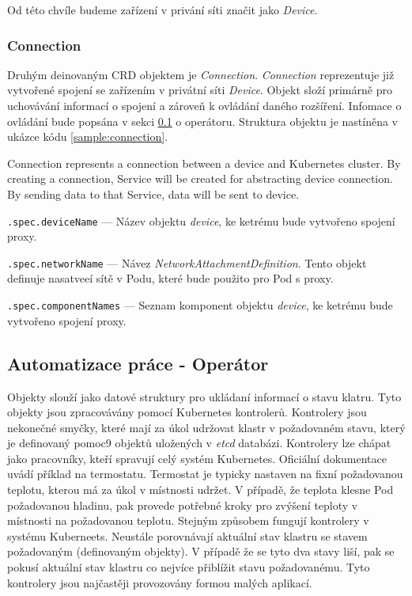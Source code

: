 Od této chvíle budeme zařízení v privání síti značit jako \textit{Device}.

\subsubsection*{Connection}
Druhým deinovaným CRD objektem je \textit{Connection}. \textit{Connection} reprezentuje již vytvořené spojení se zařízením v privátní síti \textit{Device}. Objekt složí primárně pro uchovávání informací o spojení a zároveň k ovládání daného rozšíření. Infomace o ovládání bude popsána v sekci \ref{sec:operator} o operátoru. Struktura objektu je nastíněna v ukázce kódu \ref{sample:connection}.


Connection represents a connection between a device and Kubernetes cluster. By creating a connection, Service will be created for abstracting device connection. By sending data to that Service, data will be sent to device.


\begin{description}
    \item \verb|.spec.deviceName| --- Název objektu \textit{device}, ke ketrému bude vytvořeno spojení proxy. 
    \item \verb|.spec.networkName| --- Návez \textit{NetworkAttachmentDefinition}. Tento objekt definuje nasatveeí sítě v Podu, které bude použito pro Pod s proxy.
    \item \verb|.spec.componentNames| --- Seznam komponent objektu \textit{device}, ke ketrému bude vytvořeno spojení proxy. 
\end{description}

\subsection{Automatizace práce - Operátor}\label{sec:operator}
Objekty slouží jako datové struktury pro ukládaní informací o stavu klatru. Tyto objekty jsou zpracovávány pomocí Kubernetes kontrolerů. Kontrolery jsou nekonečné smyčky, které mají za úkol udržovat klastr v požadovaném stavu, který je definovaný pomoc9 objektů uložených v \textit{etcd} databázi. Kontrolery lze chápat jako pracovníky, kteří spravují celý systém Kubernetes. Oficiální dokumentace uvádí příklad na termostatu. Termostat je typicky nastaven na fixní požadovanou teplotu, kterou má za úkol v místnosti udržet. V případě, že teplota klesne Pod požadovanou hladinu, pak provede potřebné kroky pro zvýšení teploty v místnosti na požadovanou teplotu. Stejným způsobem fungují kontrolery v systému Kuberneets. Neustále porovnávají aktuální stav klastru se stavem požadovaným (definovaným objekty). V případě že se tyto dva stavy liší, pak se pokusí aktuální stav klastru co nejvíce přiblížit stavu požadovanému. Tyto kontrolery jsou najčastěji provozovány formou malých aplikací.

